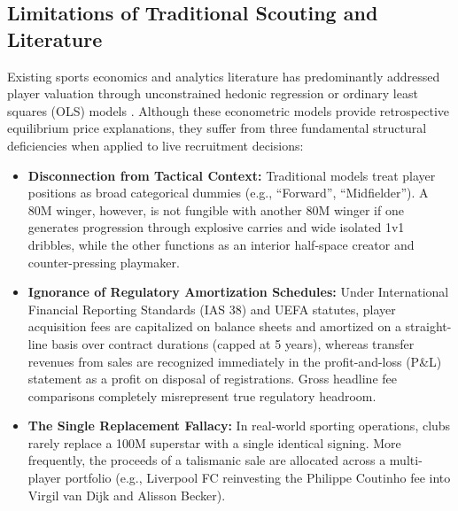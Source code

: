 \documentclass[10pt,journal,compsoc]{IEEEtran}
\begin{document}
\subsection{Limitations of Traditional Scouting and Literature}
Existing sports economics and analytics literature has predominantly addressed player valuation through unconstrained hedonic regression or ordinary least squares (OLS) models \cite{muller2017beyond, peeters2018testing, coates2016does}. Although these econometric models provide retrospective equilibrium price explanations, they suffer from three fundamental structural deficiencies when applied to live recruitment decisions:
\begin{itemize}
    \item \textbf{Disconnection from Tactical Context:} Traditional models treat player positions as broad categorical dummies (e.g., ``Forward'', ``Midfielder''). A \texteuro80M winger, however, is not fungible with another \texteuro80M winger if one generates progression through explosive carries and wide isolated 1v1 dribbles, while the other functions as an interior half-space creator and counter-pressing playmaker.
    \item \textbf{Ignorance of Regulatory Amortization Schedules:} Under International Financial Reporting Standards (IAS 38) and UEFA statutes, player acquisition fees are capitalized on balance sheets and amortized on a straight-line basis over contract durations (capped at 5 years), whereas transfer revenues from sales are recognized immediately in the profit-and-loss (P\&L) statement as a profit on disposal of registrations. Gross headline fee comparisons completely misrepresent true regulatory headroom.
    \item \textbf{The Single Replacement Fallacy:} In real-world sporting operations, clubs rarely replace a \texteuro100M superstar with a single identical signing. More frequently, the proceeds of a talismanic sale are allocated across a multi-player portfolio (e.g., Liverpool FC reinvesting the Philippe Coutinho fee into Virgil van Dijk and Alisson Becker).
\end{itemize}
\end{document}

